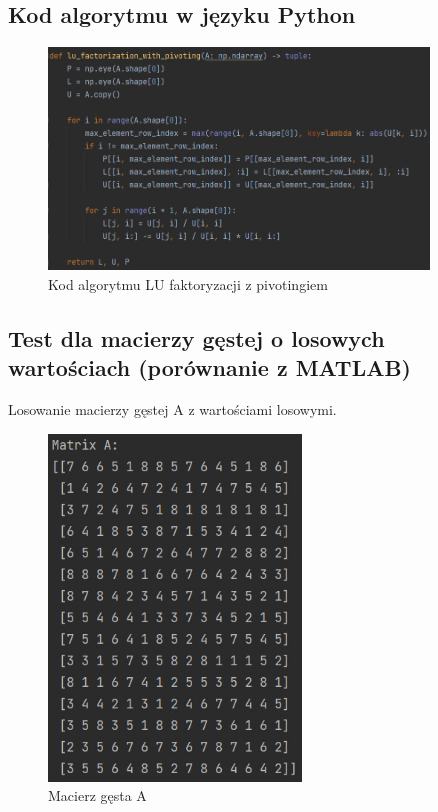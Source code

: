 \documentclass[9pt]{article}
\begin{document}
\subsection{Kod algorytmu w języku Python}

\begin{figure}[h]
  \centering
  \includegraphics[width=0.9\textwidth]{lu_factoriaztion_with_pivoting.jpg}
  \caption{Kod algorytmu LU faktoryzacji z pivotingiem}
\end{figure}
\newpage

\subsection{Test dla macierzy gęstej o losowych wartościach (porównanie z MATLAB)}

Losowanie macierzy gęstej A z wartościami losowymi.

\begin{figure}[h]
  \centering
  \includegraphics[width=0.6\textwidth]{matrix_A_4.jpg}
  \caption{Macierz gęsta A}
\end{figure}
\newpage
\end{document}
